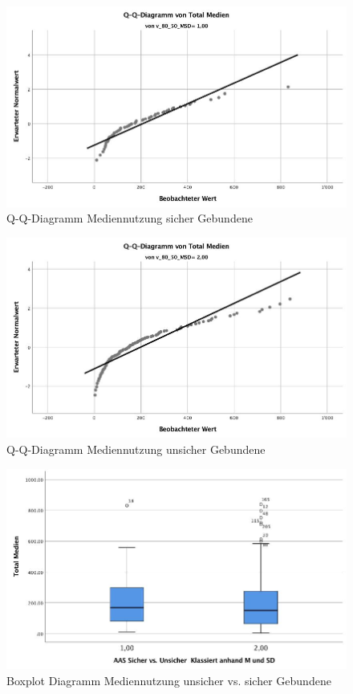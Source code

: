 \begin{figure}%
  \centering
     \includegraphics[scale=0.4]{content/Grafik/QQDiagramm_TotalMedien_SicherGebunden.jpg}
  \caption{Q-Q-Diagramm Mediennutzung sicher Gebundene}
  \label{fig:AppQQDiagrammSicherGebunden}
\end{figure}
\begin{figure}%
  \centering
     \includegraphics[scale=0.4]{content/Grafik/QQDiagramm_TotalMedien_UnsicherGebunden.jpg}
  \caption{Q-Q-Diagramm Mediennutzung unsicher Gebundene}
  \label{fig:AppQQDiagrammUnsicherGebunden}
\end{figure}

\begin{figure}%
  \centering
     \includegraphics[scale=0.4]{content/Grafik/Boxplot_TotalMedien_SicherUnsicherGebunden.jpg}
  \caption{Boxplot Diagramm Mediennutzung unsicher vs. sicher Gebundene}
  \label{fig:AppBoxplotDiagrammSicherUnsicherGebunden}
\end{figure}

